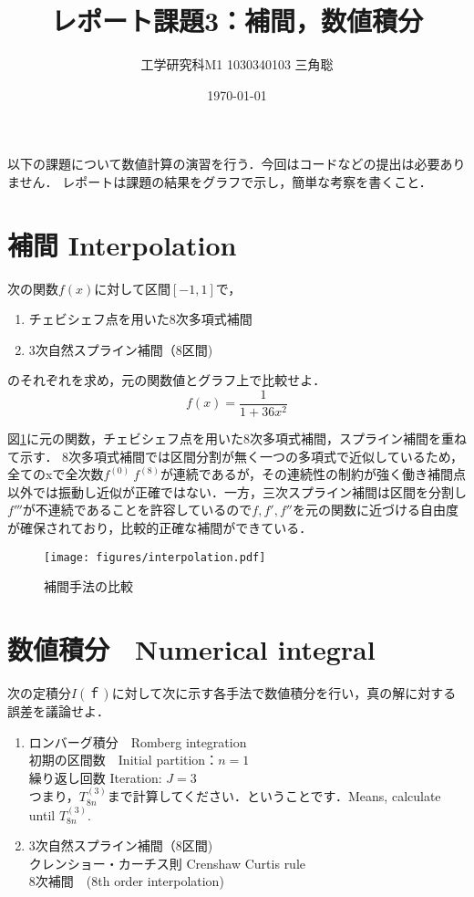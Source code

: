 \documentclass{jsarticle}
\title{レポート課題3：補間，数値積分}
\author{工学研究科M1 1030340103 三角聡}
\date{\today}
\begin{document}
\maketitle
以下の課題について数値計算の演習を行う．今回はコードなどの提出は必要ありません．
レポートは課題の結果をグラフで示し，簡単な考察を書くこと．

\section{補間 Interpolation}
次の関数$f(x)$に対して区間$[-1,1]$で，
\begin{enumerate}
\item チェビシェフ点を用いた8次多項式補間
\item 3次自然スプライン補間（8区間)
\end{enumerate}
のそれぞれを求め，元の関数値とグラフ上で比較せよ．
$$f(x)=\frac{1}{1+36x^2}$$

図\ref{interpolation-fig}に元の関数，チェビシェフ点を用いた8次多項式補間，スプライン補間を重ねて示す．
8次多項式補間では区間分割が無く一つの多項式で近似しているため，全てのxで全次数$f^{(0)}~f^{(8)}$が連続であるが，その連続性の制約が強く働き補間点以外では振動し近似が正確ではない．一方，三次スプライン補間は区間を分割し$f'''$が不連続であることを許容しているので$f,f',f''$を元の関数に近づける自由度が確保されており，比較的正確な補間ができている．


\begin{figure}[htbp]
    \texttt{[image: figures/interpolation.pdf]}
  \centering
  \caption{補間手法の比較\label{interpolation-fig}}
\end{figure}

\section{数値積分　Numerical integral}

次の定積分$I(ｆ)$に対して次に示す各手法で数値積分を行い，真の解に対する誤差を議論せよ．
\begin{enumerate}
\item ロンバーグ積分　Romberg integration
\\初期の区間数　Initial partition：$n=1$
\\繰り返し回数  Iteration: $J=3$
\\つまり，$T_{8n}^{(3)}$まで計算してください．ということです．Means, calculate until $T_{8n}^{(3)}$.
\item 3次自然スプライン補間（8区間)
\\クレンショー・カーチス則 Crenshaw Curtis rule
\\8次補間　(8th order interpolation)
\end{enumerate}
\end{document}
